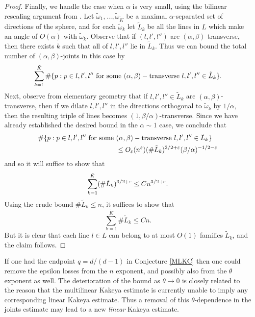 \begin{proof}
Finally, we handle the case when $\alpha$ is very small, using the
bilinear rescaling argument from \cite{TVV}. Let $\tilde
\omega_1,\ldots,\tilde \omega_{\tilde K}$ be a maximal
$\alpha$-separated set of directions of the sphere, and for each
$\tilde \omega_k$ let $\tilde L_k$ be all the lines in $L$ which
make an angle of $O(\alpha)$ with $\tilde\omega_k$.  Observe that if
$(l,l',l'')$ are $(\alpha,\beta)$-transverse, then there exists
$k$ such that all of $l,l',l''$ lie in $\tilde L_k$. Thus we can
bound the total number of $(\alpha,\beta)$-joints in this case by
$$ \sum_{k=1}^{\tilde K} \# \{ p: p \in l, l', l'' \hbox{ for some } (\alpha,\beta)-\hbox{transverse } l, l',l'' \in \tilde L_k \}.$$
Next, observe from elementary geometry that if $l,l',l'' \in
\tilde L_k$ are $(\alpha,\beta)$-transverse, then if we dilate $l,
l', l''$ in the directions orthogonal to $\tilde \omega_k$ by
$1/\alpha$, then the resulting triple of lines becomes $(1,
\beta/\alpha)$-transverse. Since we have already established the
desired bound in the $\alpha \sim 1$ case, we conclude that
\begin{eqnarray*} \begin{aligned}
\# \{ p: p \in l, l', l'' \hbox{ for some }&
(\alpha,\beta)-\hbox{transverse } l, l',l'' \in \tilde L_k \}\\&
\leq O_\varepsilon(n^\varepsilon) (\# \tilde L_k)^{3/2+\varepsilon}
(\beta/\alpha)^{-1/2-\varepsilon}\end{aligned}\end{eqnarray*} and so it
will suffice to show that
$$ \sum_{k=1}^{\tilde K} (\# \tilde L_k)^{3/2+\varepsilon} \leq C n^{3/2+\varepsilon}.$$
Using the crude bound $\# \tilde L_k \leq n$, it suffices to show
that
$$ \sum_{k=1}^{\tilde K} \# \tilde L_k \leq C n.$$
But it is clear that each line $l \in L$ can belong to at most
$O(1)$ families $\tilde L_k$, and the claim follows.
\end{proof}

\begin{remark}
If one had the endpoint $q=d/(d-1)$ in Conjecture \ref{MLKC} then
one could remove the epsilon losses from the $n$ exponent, and
possibly also from the $\theta$ exponent as well.  The
deterioration of the bound as $\theta \to 0$ is closely related to
the reason that the multilinear Kakeya estimate is currently
unable to imply any corresponding linear Kakeya estimate.  Thus a
removal of this $\theta$-dependence in the joints estimate may
lead to a new \emph{linear} Kakeya estimate.
\end{remark}

